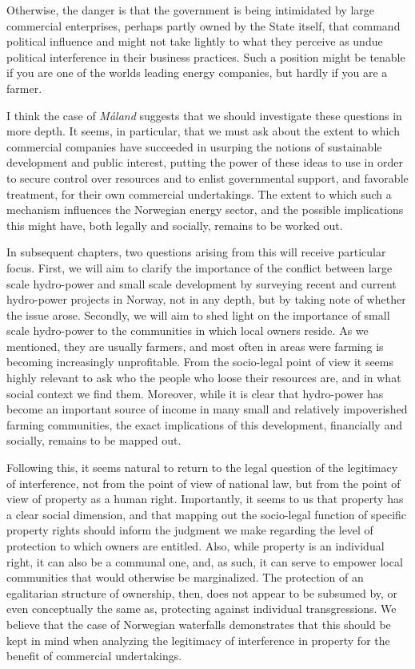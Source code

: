 Otherwise, the danger is that the government is being intimidated by large commercial enterprises, perhaps partly owned by the State itself, that command political influence and might not take lightly to what they perceive as undue political interference in their business practices. Such a position might be tenable if you are one of the worlds leading energy companies, but hardly if you are a farmer. 

I think the case of \emph{Måland} suggests that we should investigate these questions in more depth. It seems, in particular, that we must ask about the extent to which commercial companies have succeeded in usurping the notions of sustainable development and public interest, putting the power of these ideas to use in order to secure control over resources and to enlist governmental support, and favorable treatment, for their own commercial undertakings. The extent to which such a mechanism influences the Norwegian energy sector, and the possible implications this might have, both legally and socially, remains to be worked out.

In subsequent chapters, two questions arising from this will receive particular focus. First, we will aim to clarify the importance of the conflict between large scale hydro-power and small scale development by surveying recent and current hydro-power projects in Norway, not in any depth, but by taking note of whether the issue arose. Secondly, we will aim to shed light on the importance of small scale hydro-power to the communities in which local owners reside. As we mentioned, they are usually farmers, and most often in areas were farming is becoming increasingly unprofitable. From the socio-legal point of view it seems highly relevant to ask who the people who loose their resources are, and in what social context we find them. Moreover, while it is clear that hydro-power has become an important source of income in many small and relatively impoverished farming communities, the exact implications of this development, financially and socially, remains to be mapped out.

Following this, it seems natural to return to the legal question of the legitimacy of interference, not from the point of view of national law, but from the point of view of property as a human right. Importantly, it seems to us that property has a clear social dimension, and that mapping out the socio-legal function of specific property rights should inform the judgment we make regarding the level of protection to which owners are entitled. Also, while property is an individual right, it can also be a communal one, and, as such, it can serve to empower local communities that would otherwise be marginalized. The protection of an egalitarian structure of ownership, then, does not appear to be subsumed by, or even conceptually the same as, protecting against individual transgressions. We believe that the case of Norwegian waterfalls demonstrates that this should be kept in mind when analyzing the legitimacy of interference in property for the benefit of commercial undertakings.

